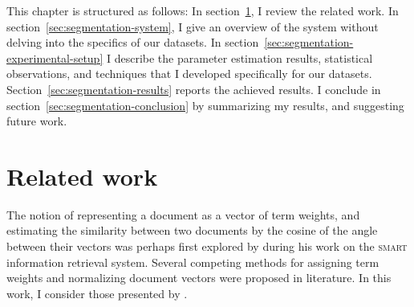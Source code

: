 \documentclass[
  digital, %
  notable, %
  lof,     %
  lot,     %
  nopalatino, color
]{fithesis3}
\newif\ifthesis\thesistrue
\newif\iflong\longtrue
\newcommand{\longsubsection}[1]{\iflong\subsection{#1}\fi}
\def\abbr#1{\textsc{\MakeLowercase{#1}}}
\begin{document}
\ifthesis This chapter \else The paper \fi is structured as follows: In section~\ref{sec:segmentation-relwork},
I review the related work. In section~\ref{sec:segmentation-system}, I give an
overview of the system without delving into the specifics of our datasets. In
section~\ref{sec:segmentation-experimental-setup} I describe the parameter
estimation results, statistical observations, and techniques that I developed
specifically for our datasets.  Section~\ref{sec:segmentation-results} reports
the achieved results.  
I conclude in section~\ref{sec:segmentation-conclusion} by summarizing my results, and
suggesting future work.

%
%
%


\section{Related work}
\label{sec:segmentation-relwork}
The notion of representing a document as a vector of term
weights, and estimating the similarity between two documents by the cosine of
the angle between their vectors
was perhaps first explored by \textcite{ml:salton71smart} during his work on the
\abbr{SMART} information retrieval system. Several
competing methods for assigning term weights and normalizing document vectors
were proposed in literature. In this work, I consider those presented by
\textcite{ml:SaltonBuckley1988,singhaletal95,%
murataetal00}.
\end{document}
